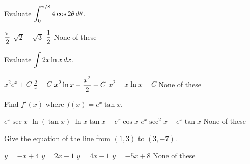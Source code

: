 \documentclass[12pt]{exam}
\newcommand{\ds}{\ensuremath{\displaystyle}}
\begin{document}
\begin{questions}
\vfill

\question[5]
Evaluate $\ds\int_{0}^{\pi/8} 4\cos2\theta\,d\theta$.

\begin{checkboxes}
\choice $\ds\frac{\pi}{2}$
\CorrectChoice $\sqrt{2}$
\choice $-\sqrt{3}$
\choice $\ds\frac{1}{2}$
\choice None of these
\end{checkboxes}

\vfill

\newpage

\question[5]
Evaluate $\ds\int 2x\ln x\,dx$.

\begin{checkboxes}
\choice $x^2e^x+C$
\choice $\frac{2}{x}+C$
\CorrectChoice $\ds x^2\ln x-\frac{x^2}{2}+C$
\choice $x^2+x\ln x + C$
\choice None of these
\end{checkboxes}

\vfill

\question[5]
Find $f'(x)$ where $f(x)=e^x\tan x$.

\begin{checkboxes}
\choice $e^x\sec x$
\choice $\ln(\tan x)$
\choice $\ln x\tan x - e^x\cos x$
\CorrectChoice $e^x\sec^2 x + e^x\tan x$
\choice None of these
\end{checkboxes}

\vfill

\question[5]
Give the equation of the line from $(1,3)$ to $(3,-7)$.

\begin{checkboxes}
\choice $y=-x+4$
\choice $y=2x-1$
\choice $y=4x-1$
\CorrectChoice $y=-5x+8$
\choice None of these
\end{checkboxes}

\vfill

\end{questions}
\end{document}

